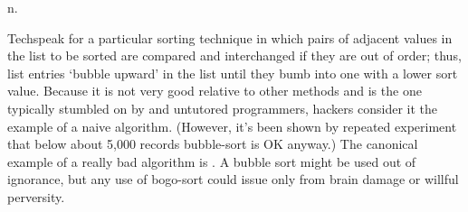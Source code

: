  n.

Techspeak for a particular sorting technique in which pairs of adjacent values
in the list to be sorted are compared and interchanged if they are out of order;
thus, list entries `bubble upward' in the list until they bumb into one with a
lower sort value. Because it is not very good relative to other methods and is
the one typically stumbled on by  and untutored programmers,
hackers consider it the  example of a naive algorithm.
(However, it's been shown by repeated experiment that below about
5,000 records bubble-sort is OK anyway.) The canonical example of a
really bad algorithm is . A bubble sort might be used out
of ignorance, but any use of bogo-sort could issue only from brain damage or
willful perversity.

